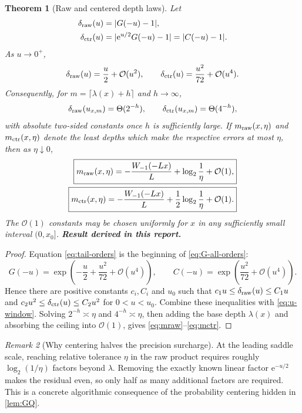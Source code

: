 \documentclass[11pt,oneside]{article}
\numberwithin{equation}{section}
\newtheorem{theorem}{Theorem}[section]
\theoremstyle{definition}
\theoremstyle{remark}
\newtheorem{remark}[theorem]{Remark}
\newcommand{\e}{\mathrm e}
\newcommand{\bigO}{\mathcal O}
\newcommand{\newresult}{\textbf{Result derived in this report.}}
\begin{document}
\begin{theorem}[Raw and centered depth laws]
\label{thm:depth-law}
Let
\begin{align}
 \delta_{\rm raw}(u)&=|G(-u)-1|,\\
 \delta_{\rm ctr}(u)&=|\e^{u/2}G(-u)-1|=|C(-u)-1|.
\end{align}
As $u\to0^+$,
\begin{equation}
 \delta_{\rm raw}(u)=\frac u2+\bigO(u^2),
 \qquad
 \delta_{\rm ctr}(u)=\frac{u^2}{72}+\bigO(u^4).
 \label{eq:tail-orders}
\end{equation}
Consequently, for $m=\lceil\lambda(x)+h\rceil$ and $h\to\infty$,
\begin{equation}
 \delta_{\rm raw}(u_{x,m})=\Theta(2^{-h}),
 \qquad
 \delta_{\rm ctr}(u_{x,m})=\Theta(4^{-h}),
 \label{eq:h-orders}
\end{equation}
with absolute two-sided constants once $h$ is sufficiently large.  If
$m_{\rm raw}(x,\eta)$ and $m_{\rm ctr}(x,\eta)$ denote the least depths which make the
respective errors at most $\eta$, then as $\eta\downarrow0$,
\begin{align}
 \boxed{
 m_{\rm raw}(x,\eta)
 =-\frac{W_{-1}(-Lx)}{L}+\log_2\frac1\eta+\bigO(1),}
 \label{eq:mraw}\\
 \boxed{
 m_{\rm ctr}(x,\eta)
 =-\frac{W_{-1}(-Lx)}{L}+\frac12\log_2\frac1\eta+\bigO(1).}
 \label{eq:mctr}
\end{align}
The $\bigO(1)$ constants may be chosen uniformly for $x$ in any sufficiently small interval
$(0,x_0]$.
\newresult
\end{theorem}

\begin{proof}
Equation \eqref{eq:tail-orders} is the beginning of \eqref{eq:G-all-orders}:
\[
 G(-u)=\exp\!\left(-\frac u2+\frac{u^2}{72}+\bigO(u^4)\right),
 \qquad
 C(-u)=\exp\!\left(\frac{u^2}{72}+\bigO(u^4)\right).
\]
Hence there are positive constants $c_i,C_i$ and $u_0$ such that
$c_1u\le\delta_{\rm raw}(u)\le C_1u$ and
$c_2u^2\le\delta_{\rm ctr}(u)\le C_2u^2$ for $0<u<u_0$.
Combine these inequalities with \eqref{eq:u-window}.  Solving $2^{-h}\asymp\eta$ and
$4^{-h}\asymp\eta$, then adding the base depth $\lambda(x)$ and absorbing the ceiling into
$\bigO(1)$, gives \eqref{eq:mraw}--\eqref{eq:mctr}.
\end{proof}

\begin{remark}[Why centering halves the precision surcharge]
At the leading saddle scale, reaching relative tolerance $\eta$ in the raw product requires
roughly $\log_2(1/\eta)$ factors beyond $\lambda$.  Removing the exactly known linear factor
$\e^{-u/2}$ makes the residual even, so only half as many additional factors are required.
This is a concrete algorithmic consequence of the probability centering hidden in
\cref{lem:GQ}.
\end{remark}
\end{document}
